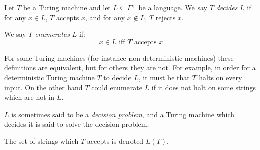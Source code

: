 \documentclass[12pt]{article}
\begin{document}
Let $T$ be a Turing machine and let $L\subseteq\Gamma^+$ be a language.  We say $T$ \emph{decides} $L$ if for any $x\in L$, $T$ accepts $x$, and for any $x\notin L$, $T$ rejects $x$.

We say $T$ \emph{enumerates} $L$ if:
$$x\in L \text{ iff } T \text{ accepts } x$$

For some Turing machines (for instance non-deterministic machines) these definitions are equivalent, but for others they are not.  For example, in order for a deterministic Turing machine $T$ to decide $L$, it must be that $T$ halts on every input.  On the other hand $T$ could enumerate $L$ if it does not halt on some strings which are not in $L$.

$L$ is sometimes said to be a \emph{decision problem}, and a Turing machine which decides it is said to solve the decision problem.

The set of strings which $T$ accepts is denoted $L(T)$.
\end{document}
